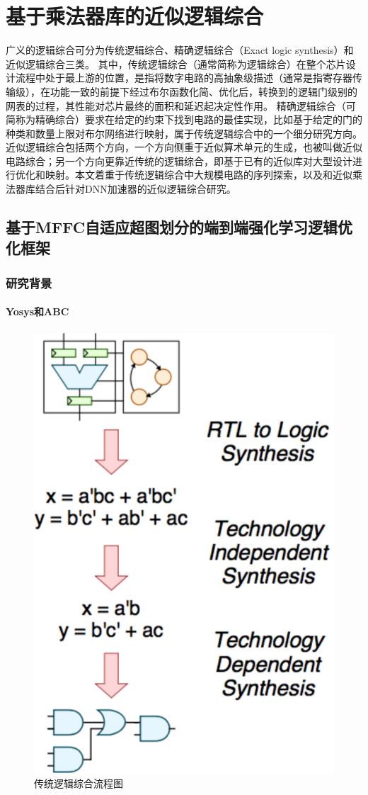 \chapter{基于乘法器库的近似逻辑综合}


广义的逻辑综合可分为传统逻辑综合、精确逻辑综合（Exact logic synthesis）和近似逻辑综合三类。
其中，传统逻辑综合（通常简称为逻辑综合）在整个芯片设计流程中处于最上游的位置，是指将数字电路的高抽象级描述（通常是指寄存器传输级），在功能一致的前提下经过布尔函数化简、优化后，转换到的逻辑门级别的网表的过程，其性能对芯片最终的面积和延迟起决定性作用。
精确逻辑综合（可简称为精确综合）要求在给定的约束下找到电路的最佳实现，比如基于给定的门的种类和数量上限对布尔网络进行映射\cite{LS:exact_syn}，属于传统逻辑综合中的一个细分研究方向。
近似逻辑综合包括两个方向，一个方向侧重于近似算术单元的生成，也被叫做近似电路综合；另一个方向更靠近传统的逻辑综合，即基于已有的近似库对大型设计进行优化和映射。本文着重于传统逻辑综合中大规模电路的序列探索，以及和近似乘法器库结合后针对DNN加速器的近似逻辑综合研究。

\section{基于MFFC自适应超图划分的端到端强化学习逻辑优化框架}

\subsection{研究背景}

\subsubsection{Yosys和ABC}

\begin{figure}[!htbp]
    \centering
    \includegraphics[width=0.4\linewidth]{./figs/LS-flow.png}
    \caption{传统逻辑综合流程图}
    \label{LS:flow}
\end{figure}


